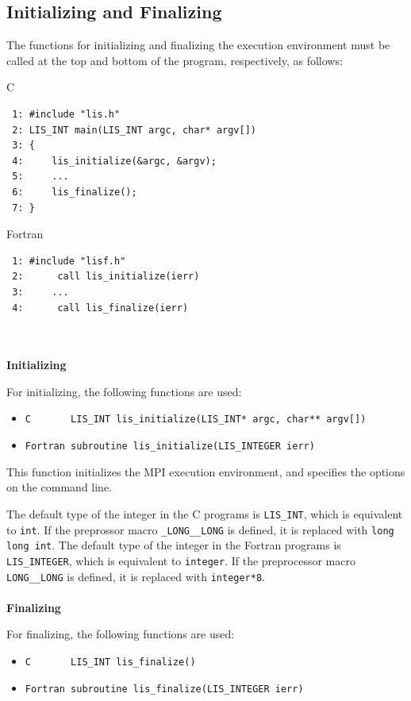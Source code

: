 \documentclass[a4paper]{article}
\begin{document}
\subsection{Initializing and Finalizing}
The functions for initializing and finalizing the execution environment 
must be called at the top and bottom of the program, respectively, as follows:
\begin{itembox}[l]{C}
\small
\begin{verbatim}
 1: #include "lis.h"
 2: LIS_INT main(LIS_INT argc, char* argv[])
 3: {
 4:     lis_initialize(&argc, &argv);
 5:     ...
 6:     lis_finalize();
 7: }
\end{verbatim}
\end{itembox}
\begin{itembox}[l]{Fortran}
\small
\begin{verbatim}
 1: #include "lisf.h"
 2:      call lis_initialize(ierr) 
 3:     ...
 4:      call lis_finalize(ierr)
\end{verbatim}
\end{itembox}
\\ \\
\noindent
{\bf Initializing}

For initializing, the following functions are used:
\begin{itemize}
\item \verb+C       LIS_INT lis_initialize(LIS_INT* argc, char** argv[])+
\item \verb+Fortran subroutine lis_initialize(LIS_INTEGER ierr)+
\end{itemize}
This function initializes the MPI execution environment, 
and specifies the options on the command line.

The default type of the integer in the C programs is {\tt LIS\_INT}, which
is equivalent to {\tt int}.  If the preprossor macro {\tt \_LONG\_\_LONG}
is defined, it is replaced with {\tt long long int}.
The default type of the integer in the Fortran programs is 
{\tt LIS\_INTEGER}, which is equivalent to {\tt integer}.  If the
preprocessor macro {\tt LONG\_\_LONG} is defined, it is replaced with 
{\tt integer*8}.
\\ \\
\noindent
{\bf Finalizing}

For finalizing, the following functions are used: 
\begin{itemize}
\item \verb+C       LIS_INT lis_finalize()+
\item \verb+Fortran subroutine lis_finalize(LIS_INTEGER ierr)+
\end{itemize}
\end{document}
